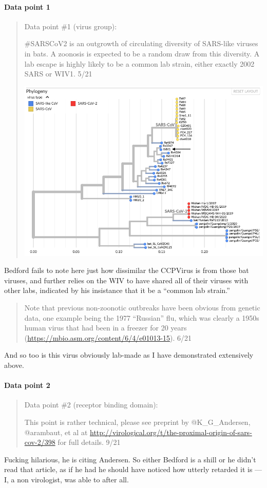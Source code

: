 \documentclass[11pt]{article}
\begin{document}
\paragraph{Data point 1}
\label{sec:orgb41942d}
\begin{quote}
Data point \#1 (virus group):

\#SARSCoV2 is an outgrowth of circulating diversity of SARS-like viruses in bats. A zoonosis is expected to be a random draw from this diversity. A lab escape is highly likely to be a common lab strain, either exactly 2002 SARS or WIV1. 5/21

\begin{center}
\includegraphics[width=.9\linewidth]{./images/bedford-0.png}
\end{center}
\end{quote}
Bedford fails to note here just how dissimilar the CCPVirus is from those bat viruses, and further relies on the WIV to have shared all of their viruses with other labs, indicated by his insistance that it be a ``common lab strain.''

\begin{quote}
Note that previous non-zoonotic outbreaks have been obvious from genetic data, one example being the 1977 ``Russian'' flu, which was clearly a 1950s human virus that had been in a freezer for 20 years (\url{https://mbio.asm.org/content/6/4/e01013-15}). 6/21
\end{quote}
And so too is this virus obviously lab-made as I have demonstrated extensively above.

\paragraph{Data point 2}
\label{sec:orga9a2047}
\begin{quote}
Data point \#2 (receptor binding domain):

This point is rather technical, please see preprint by @K\_G\_Andersen, @arambaut, et al at \url{http://virological.org/t/the-proximal-origin-of-sars-cov-2/398} for full details. 9/21
\end{quote}
Fucking hilarious, he is citing Andersen. So either Bedford is a shill or he didn't read that article, as if he had he should have noticed how utterly retarded it is --- I, a non virologist, was able to after all.
\end{document}
